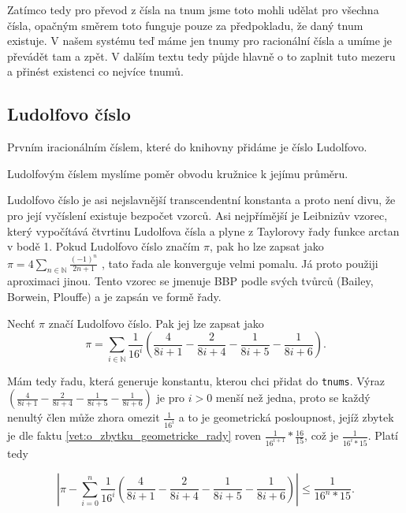 Zatímco tedy pro převod z čísla na tnum jsme toto mohli udělat pro všechna čísla, opačným směrem toto funguje pouze za předpokladu, že daný tnum existuje. V našem systému teď máme jen tnumy pro racionální čísla a umíme je převádět tam a zpět. V dalším textu tedy půjde hlavně o to zaplnit tuto mezeru a přinést existenci co nejvíce tnumů.

\subsection{Ludolfovo číslo}
Prvním iracionálním číslem, které do knihovny přidáme je číslo Ludolfovo.

\begin{definition}
Ludolfovým číslem myslíme poměr obvodu kružnice k jejímu průměru.
\end{definition}

Ludolfovo číslo je asi nejslavnější transcendentní konstanta a proto není divu, že pro její vyčíslení existuje bezpočet vzorců. Asi nejpřímější je Leibnizův vzorec, který vypočítává čtvrtinu Ludolfova čísla a plyne z Taylorovy řady funkce arctan v bodě 1. Pokud Ludolfovo číslo značím $\pi$, pak ho lze zapsat jako $\pi=4\sum_{n\in\mathbb{N}}\frac{(-1)^n}{2n+1}$ \cite{approxpi}, tato řada ale konverguje velmi pomalu. Já proto použiji aproximaci jinou. Tento vzorec se jmenuje BBP podle svých tvůrců (Bailey, Borwein, Plouffe) a je zapsán ve formě řady.

\begin{fact}
Nechť $\pi$ značí Ludolfovo číslo. Pak jej lze zapsat jako
\begin{equation}\label{rov:pi-rada}
\pi=\sum_{i\in\mathbb{N}}\frac{1}{16^i}\left(\frac{4}{8i+1}-\frac{2}{8i+4}-\frac{1}{8i+5}-\frac{1}{8i+6}\right).
\end{equation}
\end{fact}

Mám tedy řadu, která generuje konstantu, kterou chci přidat do \texttt{tnums}. Výraz $\left(\frac{4}{8i+1}-\frac{2}{8i+4}-\frac{1}{8i+5}-\frac{1}{8i+6}\right)$ je pro $i>0$ menší než jedna, proto se každý nenultý člen může zhora omezit $\frac{1}{16^i}$ a to je geometrická posloupnost, jejíž zbytek je dle faktu \ref{vet:o_zbytku_geometricke_rady} roven $\frac{1}{16^{i+1}}*\frac{16}{15}$, což je $\frac{1}{16^i*15}$. Platí tedy

\begin{equation}
\left|\pi - \sum_{i=0}^n\frac{1}{16^i}\left(\frac{4}{8i+1}-\frac{2}{8i+4}-\frac{1}{8i+5}-\frac{1}{8i+6}\right) \right| \leq \frac{1}{16^n*15}.
\end{equation}

